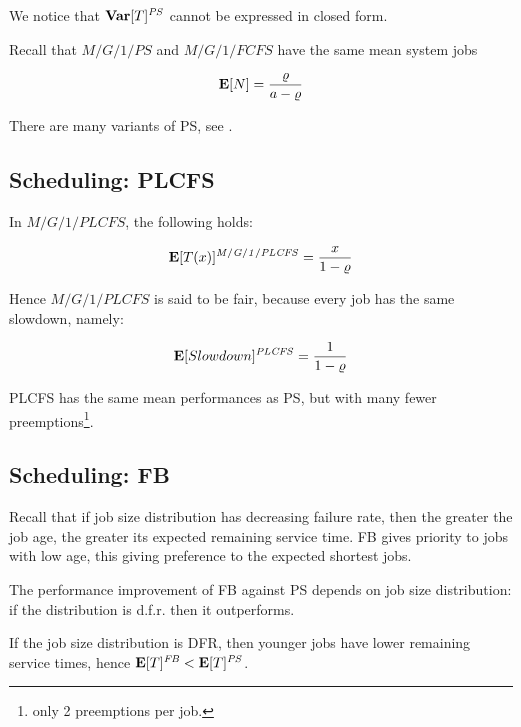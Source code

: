 We notice that $\mathbf{Var}[T]^{\mathit{PS}}$ cannot be expressed in closed form.

Recall that $M/G/1/PS$ and $M/G/1/FCFS$ have the same mean system jobs

\begin{equation*}
\mathbf{E}[N]=\frac{\varrho}{a-\varrho}
\end{equation*}

There are many variants of PS, see \cite{aalto2007beyond}.




\subsection{Scheduling: PLCFS}
\label{sec:Scheduling-PLCFS}

In $M/G/1/PLCFS$, the following holds:

\begin{equation}
\label{eqn:PLCFS-Mean-Response-Time}
\expected{T(x)}^{\mathit{M/G/1/PLCFS}}=\frac{x}{1-\varrho}
\end{equation}

Hence $M/G/1/PLCFS$ is said to be fair, because every job has the same slowdown, namely:

\begin{equation}
\label{eqn:PLCFS-Mean-Slowdown}
\expected{Slowdown}^{\mathit{PLCFS}}=\frac{1}{1-\varrho}
\end{equation}

PLCFS has the same mean performances as PS, but with many fewer preemptions\footnote{only 2 preemptions per job.}.




\subsection{Scheduling: FB}
\label{sec:Scheduling-FB}

Recall that if job size distribution has decreasing failure rate, then the greater the job age, the greater its expected remaining service time.
FB gives priority to jobs with low age, this giving preference to the expected shortest jobs.

The performance improvement of FB against PS depends on job size distribution: if the distribution is d.f.r. then it outperforms.

If the job size distribution is DFR, then younger jobs have lower remaining service times, hence $\mathbf{E}[T]^{\mathit{FB}}<\mathbf{E}[T]^{\mathit{PS}}$.

